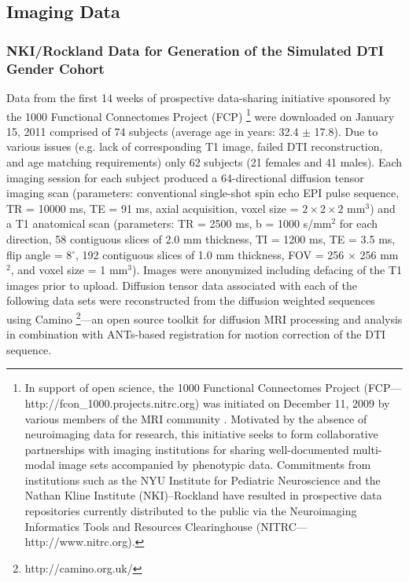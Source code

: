 \documentclass[final,5p,times,twocolumn]{elsarticle}
\begin{document}
\subsection{Imaging Data}

\subsubsection{NKI/Rockland Data for Generation of the Simulated DTI Gender Cohort}
Data from the first 14 weeks of prospective data-sharing initiative sponsored by the 1000 Functional Connectomes Project (FCP)%
\footnote{
In support of open science, the 1000 Functional Connectomes Project (FCP---http://fcon\_1000.projects.nitrc.org) 
was initiated on December 11, 2009 by various members of the MRI community \citep{Biswal2010}.  Motivated by the absence of neuroimaging data for research, this initiative seeks to form collaborative partnerships with imaging institutions for sharing well-documented multi-modal image sets accompanied by phenotypic data.  Commitments from institutions such as the NYU Institute for Pediatric Neuroscience and the Nathan Kline Institute (NKI)--Rockland have resulted in prospective data repositories
currently distributed to the public via the Neuroimaging Informatics Tools and Resources Clearinghouse (NITRC---http://www.nitrc.org).
}
were downloaded on January 15, 2011 comprised of 74 subjects (average age in years: 32.4 $\pm$ 17.8).  
Due to various issues (e.g. lack of corresponding T1 image, failed DTI reconstruction, and age matching requirements) only 62 subjects (21 females and 41 males).  Each imaging session for each subject produced a 64-directional diffusion tensor imaging scan (parameters: conventional single-shot spin echo
EPI pulse sequence, TR = 10000 ms, TE = 91 ms, axial acquisition, 
voxel size = $2 \times 2 \times 2$ mm$^3$) and a T1 anatomical scan (parameters:  TR = 2500 ms, b = 1000 s/mm$^2$ for each direction, 58 contiguous slices of 2.0 mm thickness,
TI = 1200 ms, TE = 3.5 ms, flip angle = 8$^\circ$, 192 contiguous slices of 
1.0 mm thickness, FOV = 256 $\times$ 256 mm$^2$, and voxel size = 1 mm$^3$).  Images were anonymized including defacing of the T1 images prior to upload. Diffusion tensor data associated with each of the following data sets were reconstructed from the diffusion weighted sequences using Camino%
\footnote{
http://camino.org.uk/
}---an open source toolkit for diffusion MRI processing and 
analysis \citep{Cook2006} in combination with ANTs-based 
registration for motion correction of the DTI sequence.
\end{document}

